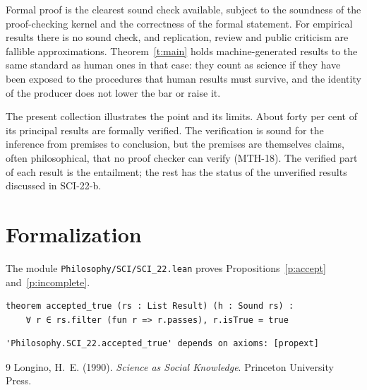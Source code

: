 \documentclass{situationist-preprint}
\begin{document}
Formal proof is the clearest sound check available, subject to the soundness of the proof-checking kernel and the correctness of the formal statement. For empirical results there is no sound check, and replication, review and public criticism are fallible approximations. Theorem~\ref{t:main} holds machine-generated results to the same standard as human ones in that case: they count as science if they have been exposed to the procedures that human results must survive, and the identity of the producer does not lower the bar or raise it.

The present collection illustrates the point and its limits. About forty per cent of its principal results are formally verified. The verification is sound for the inference from premises to conclusion, but the premises are themselves claims, often philosophical, that no proof checker can verify (MTH-18). The verified part of each result is the entailment; the rest has the status of the unverified results discussed in SCI-22-b.

\section{Formalization}

The module \nolinkurl{Philosophy/SCI/SCI_22.lean} proves Propositions~\ref{p:accept} and~\ref{p:incomplete}.

\begin{lstlisting}
theorem accepted_true (rs : List Result) (h : Sound rs) :
    ∀ r ∈ rs.filter (fun r => r.passes), r.isTrue = true
\end{lstlisting}

\begin{lstlisting}
'Philosophy.SCI_22.accepted_true' depends on axioms: [propext]
\end{lstlisting}

\begin{thebibliography}{9}\small
{} Longino, H.~E. (1990). \emph{Science as Social Knowledge}. Princeton University Press.
\end{thebibliography}
\end{document}
